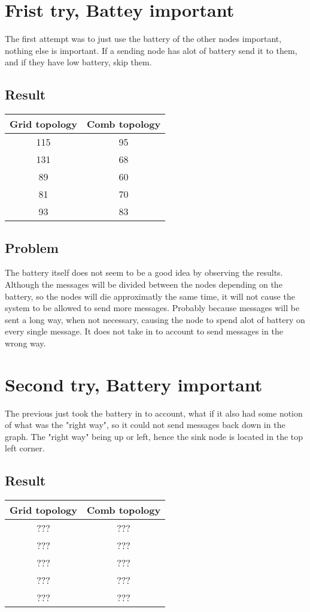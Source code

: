 \documentclass{article}
\begin{document}
\section{Frist try, Battey important}
  The first attempt was to just use the battery of the other nodes
  important, nothing else is important. If a sending node has alot of battery
  send it to them, and if they have low battery, skip them.
  \subsection{Result}
    \begin{tabular}{c|c}
      Grid topology & Comb topology\\
      \hline
      \hline
      115 & 95\\
      131 & 68\\
      89  & 60\\
      81  & 70\\
      93  & 83\\
    \end{tabular}
  \subsection{Problem}
    The battery itself does not seem to be a good idea by observing the results. 
    Although the messages will be divided between the nodes depending on the battery,
    so the nodes will die approximatly the same time, it will not cause the 
    system to be allowed to send more messages. Probably because messages will be sent 
    a long way, when not necessary, causing the node to spend alot of battery on 
    every single message.
    It does not take in to account to send messages in the wrong way.
  \section{Second try, Battery important}
    The previous just took the battery in to account, what if it also had
    some notion of what was the "right way", so it could not send messages
    back down in the graph. The "right way" being up or left, hence the sink
    node is located in the top left corner.
  \subsection{Result}
    \begin{tabular}{c|c}
      Grid topology & Comb topology\\
      \hline
      \hline
      ??? & ???\\
      ??? & ???\\
      ??? & ???\\
      ??? & ???\\
      ??? & ???\\
    \end{tabular}
 
\end{document}
